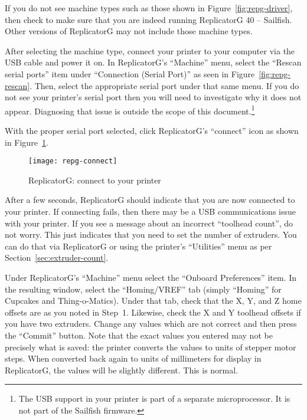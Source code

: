 If you do not see machine types such as those shown in
Figure~\ref{fig:repg-driver}, then check to make sure that you are indeed
running ReplicatorG 40 -- Sailfish.  Other versions of ReplicatorG may not
include those machine types.

After selecting the machine type, connect your printer to your
computer via the USB cable and power it on. In ReplicatorG's ``Machine'' menu,
select the ``Rescan serial ports'' item under ``Connection (Serial Port)'' as
seen in Figure~\ref{fig:repg-rescan}.
Then, select the appropriate serial port under that same menu.  If you do
not see your printer's serial port then you will need to investigate why
it does not appear.  Diagnosing that issue is outside the scope of this
document.\footnote{The USB support in your printer is part of a separate
microprocessor.  It is not part of the Sailfish firmware.}

With the proper serial port selected, click ReplicatorG's ``connect'' icon
as shown in Figure~\ref{fig:repg-connect}.

\begin{figure}[!htbp]
  \centering
    \texttt{[image: repg-connect]}
    \caption{ReplicatorG: connect to your printer}
  \label{fig:repg-connect}
\end{figure}

After a few seconds, ReplicatorG should indicate that you are now connected
to your printer.  If connecting fails, then there may be a USB communications
issue with your printer.  If you see a message about an incorrect ``toolhead
count'', do not worry.  This just indicates that you need to set the number
of extruders.  You can do that via ReplicatorG or using the printer's
``Utilities'' menu as per Section~\ref{sec:extruder-count}.

Under ReplicatorG's ``Machine'' menu select the ``Onboard Preferences''
item.  In the resulting window, select the ``Homing/VREF'' tab (simply
``Homing'' for Cupcakes and Thing-o-Matics).  Under that tab, check that
the X, Y, and Z home offsets are as you noted in Step~1.  Likewise, check
the X and Y toolhead offsets if you have two extruders.  Change any values
which are not correct and then press the ``Commit'' button.  Note that the
exact values you entered may not be precisely what is saved: the printer
converts the values to units of stepper motor steps.  When converted back
again to units of millimeters for display in ReplicatorG, the values will be
slightly different.  This is normal.

